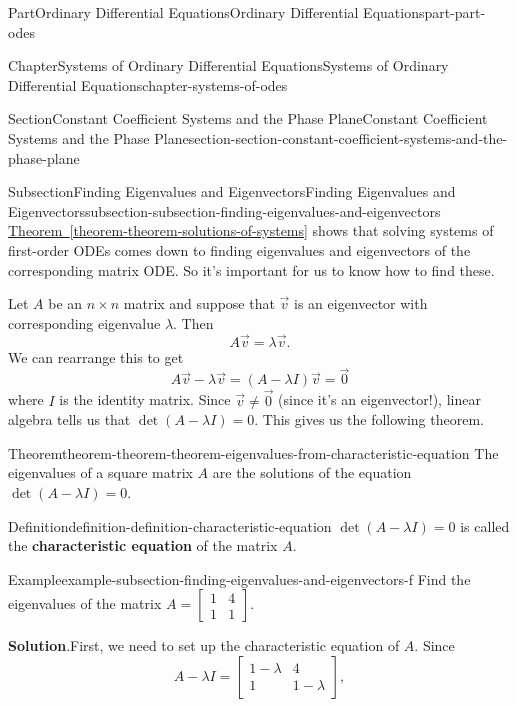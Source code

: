 \documentclass[twoside,10pt,]{book}
\newcommand{\blocktitlefont}{\relax}
\newcommand{\xreffont}{\relax}
\newcommand{\terminology}[1]{\textbf{#1}}
\numberwithin{equation}{part}
\begin{document}
\begin{partptx}{Part}{Ordinary Differential Equations}{}{Ordinary Differential Equations}{}{}{part-part-odes}
\begin{chapterptx}{Chapter}{Systems of Ordinary Differential Equations}{}{Systems of Ordinary Differential Equations}{}{}{chapter-systems-of-odes}
\begin{sectionptx}{Section}{Constant Coefficient Systems and the Phase Plane}{}{Constant Coefficient Systems and the Phase Plane}{}{}{section-section-constant-coefficient-systems-and-the-phase-plane}
\begin{subsectionptx}{Subsection}{Finding Eigenvalues and Eigenvectors}{}{Finding Eigenvalues and Eigenvectors}{}{}{subsection-subsection-finding-eigenvalues-and-eigenvectors}
\hyperref[theorem-theorem-solutions-of-systems]{Theorem~{\xreffont\ref{theorem-theorem-solutions-of-systems}}} shows that solving systems of first-order ODEs comes down to finding eigenvalues and eigenvectors of the corresponding matrix ODE. So it's important for us to know how to find these.%
\par
Let \(A\) be an \(n\times n\) matrix and suppose that \(\vec{v}\) is an eigenvector with corresponding eigenvalue \(\lambda\). Then%
\begin{equation*}
A\vec{v} = \lambda\vec{v}.
\end{equation*}
We can rearrange this to get%
\begin{equation*}
A\vec{v}-\lambda\vec{v} = (A-\lambda I)\vec{v} = \vec{0}
\end{equation*}
where \(I\) is the identity matrix. Since \(\vec{v}\neq\vec{0}\) (since it's an eigenvector!), linear algebra tells us that \(\det(A-\lambda I) = 0\). This gives us the following theorem.%
\begin{theorem}{Theorem}{}{}{theorem-theorem-theorem-eigenvalues-from-characteristic-equation}%
The eigenvalues of a square matrix \(A\) are the solutions of the equation \(\det(A-\lambda I) = 0\).%
\end{theorem}
\begin{definition}{Definition}{}{definition-definition-characteristic-equation}%
\(\det(A-\lambda I)=0\) is called the \terminology{characteristic equation} of the matrix \(A\).%
\end{definition}
\begin{example}{Example}{}{example-subsection-finding-eigenvalues-and-eigenvectors-f}%
Find the eigenvalues of the matrix \(A = \begin{bmatrix}1& 4\\1& 1\end{bmatrix}\).%
\par\smallskip%
\noindent\textbf{\blocktitlefont Solution}.\hypertarget{solution-subsection-finding-eigenvalues-and-eigenvectors-f-b}{}\quad{}First, we need to set up the characteristic equation of \(A\). Since%
\begin{equation*}
A-\lambda I = \begin{bmatrix}1-\lambda &  4 \\ 1 &  1-\lambda\end{bmatrix},

\end{equation*}
\end{example}
\end{subsectionptx}
\end{sectionptx}
\end{chapterptx}
\end{partptx}
\end{document}
